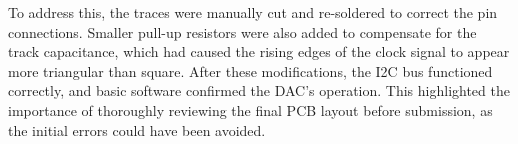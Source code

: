 To address this, the traces were manually cut and re-soldered to correct the pin connections. Smaller pull-up resistors were also added to compensate for the track capacitance, which had caused the rising edges of the clock signal to appear more triangular than square. After these modifications, the I2C bus functioned correctly, and basic software confirmed the DAC's operation. This highlighted the importance of thoroughly reviewing the final PCB layout before submission, as the initial errors could have been avoided.